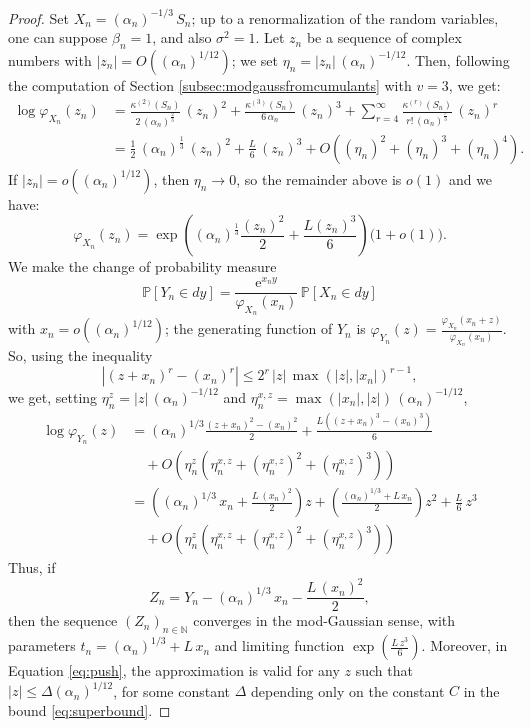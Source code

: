 \documentclass[12pt,a4paper,reqno]{amsart}
\theoremstyle{remark}
\newcommand{\N}{\mathbb{N}}
\newcommand{\E}{\mathrm{e}}
\newcommand{\proba}{\mathbb{P}}
\newcommand{\alphan}{\alpha_n}
\begin{document}
\begin{proof}
Set $X_{n}=(\alphan)^{-1/3}\,S_{n}$; up to a renormalization of the random variables, one can suppose $\beta_n=1$, and also $\sigma^{2}=1$. Let $z_n$ be a sequence of complex numbers with $|z_{n}|=O((\alphan)^{1/12})$; we set $\eta_n = |z_n| \,(\alphan)^{-1/12}$. Then, following the computation of Section \ref{subsec:modgaussfromcumulants} with $v=3$, we get:
\begin{align*}
\log \varphi_{X_n}(z_n)&=\frac{\kappa^{(2)}(S_{n})}{2\,(\alphan)^{\frac{2}{3}}}\,(z_n)^{2}+\frac{\kappa^{(3)}(S_{n})}{6\,\alphan }\,(z_n)^{3}+\sum_{r=4}^{\infty} \frac{\kappa^{(r)}(S_{n})}{r!\,(\alphan)^{\frac{r}{3}}}\,(z_n)^{r}\\
&=\frac{1}{2}\,(\alphan)^{\frac{1}{3}}\,(z_n)^{2}+\frac{L}{6}\,(z_n)^{3}+ O((\eta_n)^2 + (\eta_n)^3+(\eta_n)^4).
\end{align*}
If $|z_{n}|=o((\alphan)^{1/12})$, then $\eta_n \to 0$, so the remainder above is $o(1)$ and we have:
\begin{equation}
\varphi_{X_{n}}(z_{n})=\exp\left((\alphan)^{\frac{1}{3}}\frac{(z_{n})^{2}}{2}+\frac{L(z_{n})^{3}}{6}\right)\big(1+o(1)\big).
\label{EqPhiXn}
\end{equation}
We make the change of probability measure 
$$\proba[Y_{n} \in dy]=\frac{\E^{x_ny}}{\varphi_{X_{n}}(x_n)}\,\proba[X_{n} \in dy]$$ 
with $x_n=o((\alphan)^{1/12})$; the generating function of $Y_{n}$ is $\varphi_{Y_{n}}(z)= \frac{\varphi_{X_{n}}(x_n+z)}{\varphi_{X_{n}}(x_n)}$. So, using the inequality
$$|(z+x_n)^r - (x_n)^r| \leq 2^r\,|z|\,\max(|z|,|x_n|)^{r-1},$$
we get, setting $\eta_n^z = |z|\,(\alphan)^{-1/12}$ and $\eta_n^{x,z} = \max(|x_n|,|z|)\,(\alphan)^{-1/12}$,
\begin{align}
\log \varphi_{Y_{n}}(z)&=(\alphan)^{1/3}\frac{(z+x_{n})^{2}-(x_n)^2}{2}+\frac{L((z+x_{n})^{3}-(x_n)^3)}{6}\nonumber\\
&\quad+O(\eta_{n}^z(\eta_n^{x,z} + (\eta_n^{x,z})^2+(\eta_n^{x,z})^3))\nonumber\\
&=\left((\alphan)^{1/3}\,x_{n} +\frac{L\,(x_{n})^{2}}{2}\right)z+\left(\frac{(\alphan)^{1/3}+L\,x_{n}}{2}\right)z^{2}+\frac{L}{6}\,z^{3}\nonumber\\
&\quad+O(\eta_{n}^z(\eta_n^{x,z} + (\eta_n^{x,z})^2+(\eta_n^{x,z})^3))\label{eq:push}
\end{align}
Thus, if 
$$Z_{n}=Y_{n}-(\alphan)^{1/3}\,x_{n} -\frac{L\,(x_{n})^{2}}{2},$$
then the sequence $(Z_{n})_{n \in \N}$ converges in the mod-Gaussian sense, with parameters $t_n=(\alphan)^{1/3}+L\,x_{n}$ and limiting function $\exp(\frac{L\,z^{3}}{6})$. Moreover, in Equation \eqref{eq:push}, the approximation is valid for any $z$ such that $|z|\leq \Delta(\alphan)^{1/12}$, for some constant $\Delta$ depending only on the constant $C$ in the bound \eqref{eq:superbound}.\bigskip


\end{proof}
\end{document}
